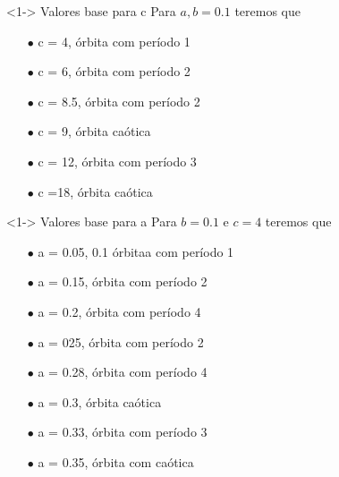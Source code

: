 \documentclass{beamer}
\begin{document}

\begin{frame}
	\begin{exampleblock}
		<1-> {Valores base para c}
			Para $a, b = 0.1$ teremos que 
			\begin{itemize}
				\item[$\bullet$] c = 4, órbita com período 1
				\item[$\bullet$] c = 6, órbita com período 2
				\item[$\bullet$] c = 8.5, órbita com período 2
				\item[$\bullet$] c = 9, órbita caótica
				\item[$\bullet$] c = 12, órbita com período 3
				\item[$\bullet$] c =18, órbita caótica
			\end{itemize}	
	\end{exampleblock}
\end{frame}


\begin{frame}
	\begin{exampleblock}
		<1-> {Valores base para a}
			Para $b = 0.1$ e $c = 4$ teremos que 
			\begin{itemize}
				\item[$\bullet$] a = 0.05, 0.1 órbitaa com período 1
				\item[$\bullet$] a = 0.15, órbita com período 2
				\item[$\bullet$] a = 0.2, órbita com período 4
				\item[$\bullet$] a = 025, órbita com período 2
				\item[$\bullet$] a = 0.28, órbita com período 4
				\item[$\bullet$] a = 0.3, órbita caótica
				\item[$\bullet$] a = 0.33, órbita com período 3
				\item[$\bullet$] a = 0.35, órbita com caótica
			\end{itemize}	
	\end{exampleblock}
\end{frame}

\end{document}
